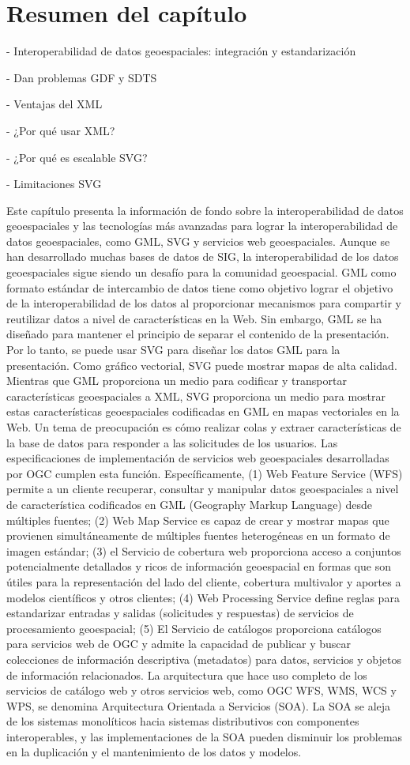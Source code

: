 \section{Resumen del capítulo}

- Interoperabilidad de datos geoespaciales: integración y estandarización

- Dan problemas GDF y SDTS

- Ventajas del XML

- ¿Por qué usar XML?

- ¿Por qué es escalable SVG?

- Limitaciones SVG

Este capítulo presenta la información de fondo sobre la interoperabilidad de datos geoespaciales y las tecnologías más avanzadas para lograr la interoperabilidad de datos geoespaciales, como GML, SVG y servicios web geoespaciales. Aunque se han desarrollado muchas bases de datos de SIG, la interoperabilidad de los datos geoespaciales sigue siendo un desafío para la comunidad geoespacial. GML como formato estándar de intercambio de datos tiene como objetivo lograr el objetivo de la interoperabilidad de los datos al proporcionar mecanismos para compartir y reutilizar datos a nivel de características en la Web. Sin embargo, GML se ha diseñado para mantener el principio de separar el contenido de la presentación. Por lo tanto, se puede usar SVG para diseñar los datos GML para la presentación. Como gráfico vectorial, SVG puede mostrar mapas de alta calidad. Mientras que GML proporciona un medio para codificar y transportar características geoespaciales a XML, SVG proporciona un medio para mostrar estas características geoespaciales codificadas en GML en mapas vectoriales en la Web. Un tema de preocupación es cómo realizar colas y extraer características de la base de datos para responder a las solicitudes de los usuarios. Las especificaciones de implementación de servicios web geoespaciales desarrolladas por OGC cumplen esta función. Específicamente, (1) Web Feature Service (WFS) permite a un cliente recuperar, consultar y manipular datos geoespaciales a nivel de característica codificados en GML (Geography Markup Language) desde múltiples fuentes; (2) Web Map Service es capaz de crear y mostrar mapas que provienen simultáneamente de múltiples fuentes heterogéneas en un formato de imagen estándar; (3) el Servicio de cobertura web proporciona acceso a conjuntos potencialmente detallados y ricos de información geoespacial en formas que son útiles para la representación del lado del cliente, cobertura multivalor y aportes a modelos científicos y otros clientes; (4) Web Processing Service define reglas para estandarizar entradas y salidas (solicitudes y respuestas) de servicios de procesamiento geoespacial; (5) El Servicio de catálogos proporciona catálogos para servicios web de OGC y admite la capacidad de publicar y buscar colecciones de información descriptiva (metadatos) para datos, servicios y objetos de información relacionados. La arquitectura que hace uso completo de los servicios de catálogo web y otros servicios web, como OGC WFS, WMS, WCS y WPS, se denomina Arquitectura Orientada a Servicios (SOA). La SOA se aleja de los sistemas monolíticos hacia sistemas distributivos con componentes interoperables, y las implementaciones de la SOA pueden disminuir los problemas en la duplicación y el mantenimiento de los datos y modelos.











